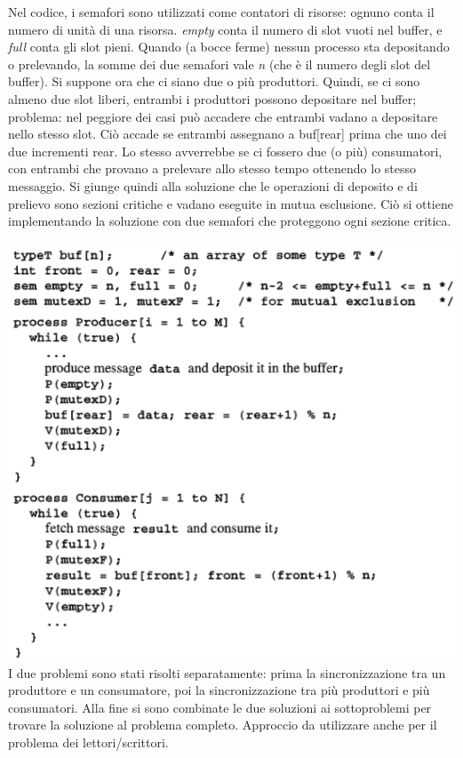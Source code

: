 \documentclass[10pt,a4paper]{book}
\begin{document}
Nel codice, i semafori sono utilizzati come contatori di risorse: ognuno conta il numero di unità di una risorsa. \textit{empty} conta il numero di slot vuoti nel buffer, e \textit{full} conta gli slot pieni. Quando (a bocce ferme) nessun processo sta depositando o prelevando, la somme dei due semafori vale \textit{n} (che è il numero degli slot del buffer). 
Si suppone ora che ci siano due o più produttori. Quindi, se ci sono almeno due slot liberi, entrambi i produttori possono depositare nel buffer; problema: nel peggiore dei casi può accadere che entrambi vadano a depositare nello stesso slot. Ciò accade se entrambi assegnano a buf[rear] prima che uno dei due incrementi rear. Lo stesso avverrebbe se ci fossero due (o più) consumatori, con entrambi che provano a prelevare allo stesso tempo ottenendo lo stesso messaggio. Si giunge quindi alla soluzione che le operazioni di deposito e di prelievo sono sezioni critiche e vadano eseguite in mutua esclusione. Ciò si ottiene implementando la soluzione con due semafori che proteggono ogni sezione critica.\\ \\
\includegraphics[scale=0.5]{img/bound2.png} \\
I due problemi sono stati risolti separatamente: prima la sincronizzazione tra un produttore e un consumatore, poi la sincronizzazione tra più produttori e più consumatori. Alla fine si sono combinate le due soluzioni ai sottoproblemi per trovare la soluzione al problema completo. Approccio da utilizzare anche per il problema dei lettori/scrittori.
\end{document}

